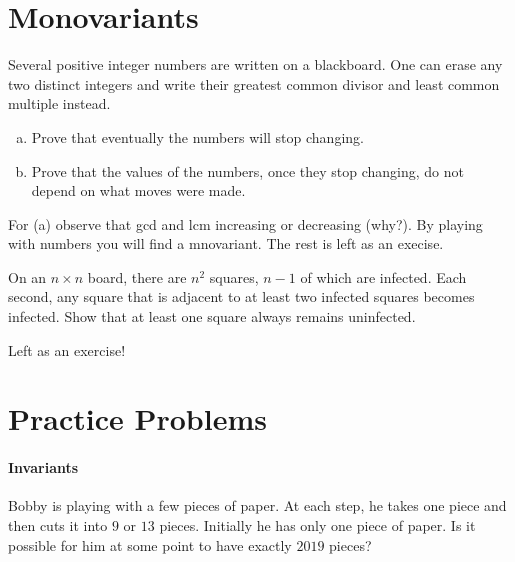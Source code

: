 \section{Monovariants}

\begin{example}
Several positive integer numbers are written on a blackboard. One can erase any two distinct integers and write their greatest common divisor and least common multiple instead.
\begin{enumerate}[(a)]
	\item Prove that eventually the numbers will stop changing.
	\item Prove that the values of the numbers, once they stop changing, do not depend on what moves were made.
\end{enumerate}
\end{example}

\begin{soln}
For (a) observe that gcd and lcm increasing or decreasing (why?). By playing with numbers you will find a mnovariant. 
The rest is left as an execise.
\end{soln}





\begin{example}
On an $n\times n$ board, there are $n^2$ squares, $n-1$ of which are infected. Each second, any square that is adjacent to at least two infected squares becomes infected. Show that at least one square always remains uninfected.
\end{example}

\begin{soln}
Left as an exercise!
\end{soln}



\section{Practice Problems}

\paragraph{Invariants}

\begin{problem}
Bobby is playing with a few pieces of paper. At each step, he takes one piece and 
then cuts it into $9$ or $13$ pieces. Initially he has only one piece of paper. Is it 
possible for him at some point to have exactly $2019$ pieces?
	\begin{hintone}
	\end{hintone}
\end{problem}

